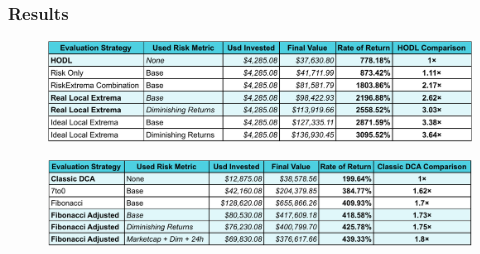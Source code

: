 
\begin{frame}
  \frametitle{Results}
  \centering

  \begin{figure}
    \includegraphics[width=\textwidth]{img/long-term-table.pdf}
  \end{figure}

  \smallskip

  \begin{figure}
  \includegraphics[width=\textwidth]{img/dca-table.pdf}
  \end{figure}
\end{frame}





